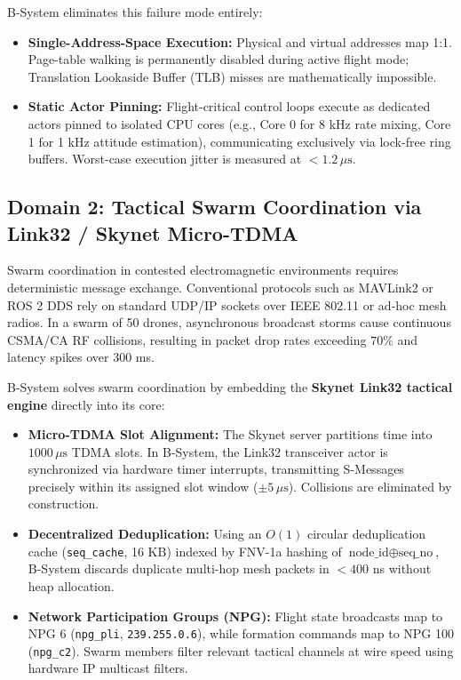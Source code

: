 \documentclass[10pt,journal,compsoc,twocolumn]{article}
\begin{document}
B-System eliminates this failure mode entirely:
\begin{itemize}[leftmargin=*]
    \item \textbf{Single-Address-Space Execution:} Physical and virtual addresses map 1:1. Page-table walking is permanently disabled during active flight mode; Translation Lookaside Buffer (TLB) misses are mathematically impossible.
    \item \textbf{Static Actor Pinning:} Flight-critical control loops execute as dedicated actors pinned to isolated CPU cores (e.g., Core 0 for 8 kHz rate mixing, Core 1 for 1 kHz attitude estimation), communicating exclusively via lock-free ring buffers. Worst-case execution jitter is measured at $<1.2\,\mu\text{s}$.
\end{itemize}

\subsection{Domain 2: Tactical Swarm Coordination via Link32 / Skynet Micro-TDMA}
Swarm coordination in contested electromagnetic environments requires deterministic message exchange. Conventional protocols such as MAVLink2 or ROS 2 DDS rely on standard UDP/IP sockets over IEEE 802.11 or ad-hoc mesh radios. In a swarm of 50 drones, asynchronous broadcast storms cause continuous CSMA/CA RF collisions, resulting in packet drop rates exceeding $70\%$ and latency spikes over 300 ms.

B-System solves swarm coordination by embedding the \textbf{Skynet Link32 tactical engine} directly into its core:
\begin{itemize}[leftmargin=*]
    \item \textbf{Micro-TDMA Slot Alignment:} The Skynet server partitions time into $1000\,\mu\text{s}$ TDMA slots. In B-System, the Link32 transceiver actor is synchronized via hardware timer interrupts, transmitting S-Messages precisely within its assigned slot window ($\pm 5\,\mu\text{s}$). Collisions are eliminated by construction.
    \item \textbf{Decentralized Deduplication:} Using an $O(1)$ circular deduplication cache (\texttt{seq\_cache}, 16 KB) indexed by FNV-1a hashing of $\text{node\_id} \oplus \text{seq\_no}$, B-System discards duplicate multi-hop mesh packets in $<400$ ns without heap allocation.
    \item \textbf{Network Participation Groups (NPG):} Flight state broadcasts map to NPG 6 (\texttt{npg\_pli}, \texttt{239.255.0.6}), while formation commands map to NPG 100 (\texttt{npg\_c2}). Swarm members filter relevant tactical channels at wire speed using hardware IP multicast filters.
\end{itemize}
\end{document}

